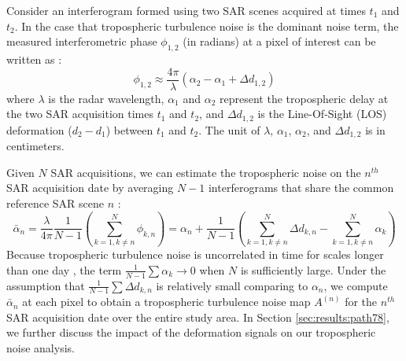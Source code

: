 Consider an interferogram formed using two SAR scenes acquired at times $t_1$ and $t_2$. In the case that tropospheric turbulence noise is the dominant noise term, the measured interferometric phase $\phi_{1,2}$ (in radians) at a pixel of interest can be written as \citep{Zebker1997AtmosphericEffectsInterferometric}:
\begin{equation}
	\phi_{1,2} \approx \frac{4 \pi}{\lambda} \left(\alpha_2 - \alpha_1 + \Delta d_{1,2} \right)
\end{equation}
where $ \lambda $ is the radar wavelength, $\alpha_1$ and $\alpha_2$ represent the tropospheric delay at the two SAR acquisition times $t_1$ and $t_2$, and $\Delta d_{1,2} $ is the Line-Of-Sight (LOS) deformation ($d_2-d_1$) between $t_1$ and $t_2$. The unit of $\lambda$, $\alpha_1$, $\alpha_2$, and $\Delta d_{1,2} $ is in centimeters. 

Given $N$ SAR acquisitions, we can estimate the tropospheric noise on the $n^{th}$ SAR acquisition date by averaging $N-1$ interferograms that share the common reference SAR scene $n$ \citep{Tymofyeyeva2015MitigationAtmosphericPhase}:
\begin{equation}
	\bar{\alpha}_n = \frac{\lambda}{4 \pi} \frac{1}{N-1} \left(\sum_{k=1, k \neq n}^{N} \phi_{k,n}\right)  
	=  \alpha_n  + \frac{1}{N-1} \left( \sum_{k=1, k \neq n}^{N}  \Delta d_{k,n} - \sum_{k=1, k \neq n}^{N}  \alpha_k  \right)  \label{eq:avg-ifg} 
\end{equation}
Because tropospheric turbulence noise is uncorrelated in time for scales longer than one day \citep{Emardson2003NeutralAtmosphericDelay, Onn2006ModelingWaterVapor}, the term $ \frac{1}{N-1} \sum \alpha_k \rightarrow 0$ when $N$ is sufficiently large. 
Under the assumption that $ \frac{1}{N-1} \sum \Delta d_{k,n} $ is relatively small comparing to $\alpha_n$, we compute $ \bar{\alpha}_n $ at each pixel to obtain a tropospheric turbulence noise map $A^{(n)}$ for the $n^{th}$ SAR acquisition date over the entire study area. In Section \ref{sec:results:path78}, we further discuss the impact of the deformation signals on our tropospheric noise analysis.


